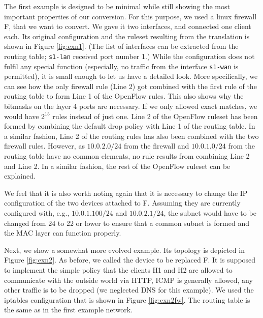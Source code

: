 The first example is designed to be minimal while still showing the most important properties of our conversion.
For this purpose, we used a linux firewall F, that we want to convert.
We gave it two interfaces, and connected one client each.
Its original configuration and the ruleset resulting from the translation is shown in Figure \ref{fig:exn1}. (The list of interfaces can be extracted from the routing table; \texttt{s1-lan} received port number 1.)
While the configuration does not fulfil any special function (especially, no traffic from the interface \texttt{s1-wan} is permitted), it is small enough to let us have a detailed look.
More specifically, we can see how the only firewall rule (Line 2) got combined with the first rule of the routing table to form Line 1 of the OpenFlow rules.
This also shows why the bitmasks on the layer 4 ports are necessary. If we only allowed exact matches, we would have $2^{15}$ rules instead of just one.
Line 2 of the OpenFlow ruleset has been formed by combining the default drop policy with Line 1 of the routing table.
In a similar fashion, Line 2 of the routing rules has also been combined with the two firewall rules.
However, as $10.0.2.0/24$ from the firewall and $10.0.1.0/24$ from the routing table have no common elements, no rule results from combining Line 2 and Line 2.
In a similar fashion, the rest of the OpenFlow ruleset can be explained.

We feel that it is also worth noting again that it is necessary to change the IP configuration of the two devices attached to F.
Assuming they are currently configured with, e.g., $10.0.1.100/24$ and $10.0.2.1/24$, the subnet would have to be changed from 24 to 22 or lower to ensure that a common subnet is formed and the MAC layer can function properly.

Next, we show a somewhat more evolved example.
Its topology is depicted in Figure \ref{fig:exn2}.
As before, we called the device to be replaced F.
It is supposed to implement the simple policy that the clients H1 and H2 are allowed to communicate with the outside world via HTTP, ICMP is generally allowed, any other traffic is to be dropped (we neglected DNS for this example).
We used the iptables configuration that is shown in Figure \ref{fig:exn2fw}.
The routing table is the same as in the first example network.

